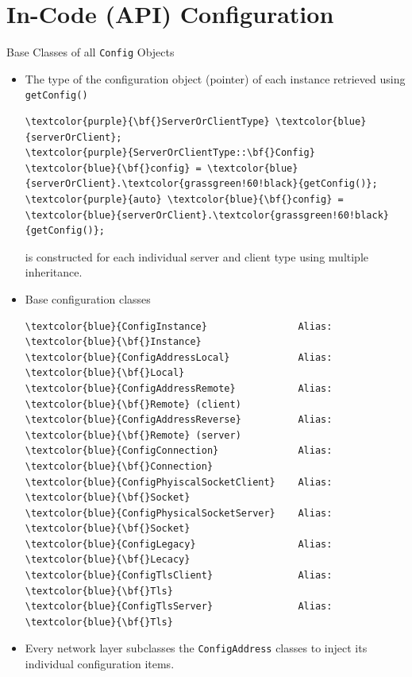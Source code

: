 \nopartpage
\part[withpartpage]{In-Code (API) Configuration}
\withpartpage

\begin{frame}[fragile]{Base Classes of all \lstinline|Config| Objects}
\begin{itemize}
    \item The type of the \alert{configuration object (pointer)} of each instance retrieved using \lstinline|getConfig()|
\begin{small}
\begin{Verbatim}[commandchars=\\\{\}, frame=leftline,rulecolor=\color{fh-ooe-red}]
\textcolor{purple}{\bf{}ServerOrClientType} \textcolor{blue}{serverOrClient};
\textcolor{purple}{ServerOrClientType::\bf{}Config} \textcolor{blue}{\bf{}config} = \textcolor{blue}{serverOrClient}.\textcolor{grassgreen!60!black}{getConfig()};
\textcolor{purple}{auto} \textcolor{blue}{\bf{}config} = \textcolor{blue}{serverOrClient}.\textcolor{grassgreen!60!black}{getConfig()};
\end{Verbatim}
\end{small}
    is constructed for each individual \alert{server} and \alert{client} type using \alert{multiple inheritance}.
    \item Base configuration classes
\begin{small}
\begin{Verbatim}[commandchars=\\\{\}, frame=leftline,rulecolor=\color{fh-ooe-red}, obeytabs=true,tabsize=4]
\textcolor{blue}{ConfigInstance}                Alias: \textcolor{blue}{\bf{}Instance}
\textcolor{blue}{ConfigAddressLocal}            Alias: \textcolor{blue}{\bf{}Local}
\textcolor{blue}{ConfigAddressRemote}           Alias: \textcolor{blue}{\bf{}Remote} (client)
\textcolor{blue}{ConfigAddressReverse}          Alias: \textcolor{blue}{\bf{}Remote} (server)
\textcolor{blue}{ConfigConnection}              Alias: \textcolor{blue}{\bf{}Connection}
\textcolor{blue}{ConfigPhyiscalSocketClient}    Alias: \textcolor{blue}{\bf{}Socket}
\textcolor{blue}{ConfigPhysicalSocketServer}    Alias: \textcolor{blue}{\bf{}Socket}
\textcolor{blue}{ConfigLegacy}                  Alias: \textcolor{blue}{\bf{}Lecacy}
\textcolor{blue}{ConfigTlsClient}               Alias: \textcolor{blue}{\bf{}Tls}
\textcolor{blue}{ConfigTlsServer}               Alias: \textcolor{blue}{\bf{}Tls}
\end{Verbatim}
\end{small}
\item Every \alert{network layer subclasses} the \lstinline|ConfigAddress| classes to \alert{inject} its \alert{individual configuration} items.
\end{itemize}
\end{frame}
